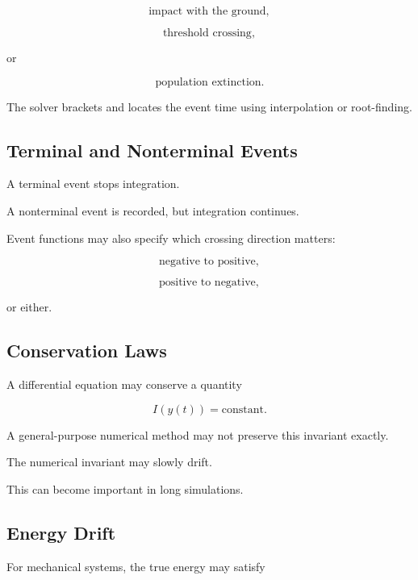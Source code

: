 \[
\boxed{
\text{impact with the ground},
}
\]

\[
\boxed{
\text{threshold crossing},
}
\]

or

\[
\boxed{
\text{population extinction}.
}
\]

The solver brackets and locates the event time using interpolation or
root-finding.

\subsection{Terminal and Nonterminal Events}
\label{subsec:terminal-nonterminal-events}

A terminal event stops integration.

A nonterminal event is recorded, but integration continues.

Event functions may also specify which crossing direction matters:

\[
\boxed{
\text{negative to positive},
}
\]

\[
\boxed{
\text{positive to negative},
}
\]

or either.

\subsection{Conservation Laws}
\label{subsec:numerical-ode-conservation}

A differential equation may conserve a quantity

\[
\boxed{
I(y(t))
=
\text{constant}.
}
\]

A general-purpose numerical method may not preserve this invariant
exactly.

The numerical invariant may slowly drift.

This can become important in long simulations.

\subsection{Energy Drift}
\label{subsec:energy-drift}

For mechanical systems, the true energy may satisfy

